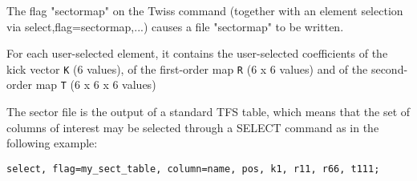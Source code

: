 The flag "sectormap" on the Twiss command (together with an element
selection via select,flag=sectormap,...) causes a file "sectormap" to be
written.   

For each user-selected element, it contains the user-selected coefficients of the kick vector 
\texttt{K} (6 values), of the first-order map 
\texttt{R} (6 x 6 values) and of the second-order map 
\texttt{T} (6 x 6 x 6 values)

The sector file is the output of a standard TFS table, which means that
the set of columns of interest may be selected through a SELECT command
as in the following example:  


\begin{verbatim}
select, flag=my_sect_table, column=name, pos, k1, r11, r66, t111;
\end{verbatim}


